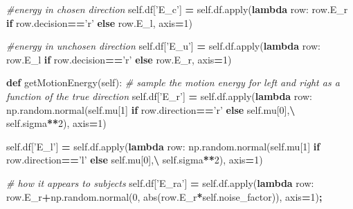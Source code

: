 \documentclass[12pt,twoside]{reedthesis}
\newenvironment{Shaded}{\begin{snugshade}}{\end{snugshade}}
\newcommand{\BuiltInTok}[1]{#1}
\newcommand{\CommentTok}[1]{\textcolor[rgb]{0.56,0.35,0.01}{\textit{#1}}}
\newcommand{\ControlFlowTok}[1]{\textcolor[rgb]{0.13,0.29,0.53}{\textbf{#1}}}
\newcommand{\DecValTok}[1]{\textcolor[rgb]{0.00,0.00,0.81}{#1}}
\newcommand{\KeywordTok}[1]{\textcolor[rgb]{0.13,0.29,0.53}{\textbf{#1}}}
\newcommand{\NormalTok}[1]{#1}
\newcommand{\OperatorTok}[1]{\textcolor[rgb]{0.81,0.36,0.00}{\textbf{#1}}}
\newcommand{\StringTok}[1]{\textcolor[rgb]{0.31,0.60,0.02}{#1}}
\newcommand{\VariableTok}[1]{\textcolor[rgb]{0.00,0.00,0.00}{#1}}
\begin{document}
\begin{Shaded}
\begin{Highlighting}[]
        \CommentTok{#energy in chosen direction}
        \VariableTok{self}\NormalTok{.df[}\StringTok{'E_c'}\NormalTok{] }\OperatorTok{=} \VariableTok{self}\NormalTok{.df.}\BuiltInTok{apply}\NormalTok{(}\KeywordTok{lambda}\NormalTok{ row: row.E_r }\ControlFlowTok{if}\NormalTok{ row.decision}\OperatorTok{==}\StringTok{'r'} \ControlFlowTok{else}\NormalTok{ row.E_l, axis}\OperatorTok{=}\DecValTok{1}\NormalTok{)}
        
        \CommentTok{#energy in unchosen direction}
        \VariableTok{self}\NormalTok{.df[}\StringTok{'E_u'}\NormalTok{] }\OperatorTok{=} \VariableTok{self}\NormalTok{.df.}\BuiltInTok{apply}\NormalTok{(}\KeywordTok{lambda}\NormalTok{ row: row.E_l }\ControlFlowTok{if}\NormalTok{ row.decision}\OperatorTok{==}\StringTok{'r'} \ControlFlowTok{else}\NormalTok{ row.E_r, axis}\OperatorTok{=}\DecValTok{1}\NormalTok{)}
        
    \KeywordTok{def}\NormalTok{ getMotionEnergy(}\VariableTok{self}\NormalTok{):}
    \CommentTok{# sample the motion energy for left and right as a function of the true direction}
        \VariableTok{self}\NormalTok{.df[}\StringTok{'E_r'}\NormalTok{] }\OperatorTok{=} \VariableTok{self}\NormalTok{.df.}\BuiltInTok{apply}\NormalTok{(}\KeywordTok{lambda}\NormalTok{ row: np.random.normal(}\VariableTok{self}\NormalTok{.mu[}\DecValTok{1}\NormalTok{] }\ControlFlowTok{if}\NormalTok{ row.direction}\OperatorTok{==}\StringTok{'r'} \ControlFlowTok{else} \VariableTok{self}\NormalTok{.mu[}\DecValTok{0}\NormalTok{],}\OperatorTok{\textbackslash{}}
                               \VariableTok{self}\NormalTok{.sigma}\OperatorTok{**}\DecValTok{2}\NormalTok{), axis}\OperatorTok{=}\DecValTok{1}\NormalTok{)}

        \VariableTok{self}\NormalTok{.df[}\StringTok{'E_l'}\NormalTok{] }\OperatorTok{=} \VariableTok{self}\NormalTok{.df.}\BuiltInTok{apply}\NormalTok{(}\KeywordTok{lambda}\NormalTok{ row: np.random.normal(}\VariableTok{self}\NormalTok{.mu[}\DecValTok{1}\NormalTok{] }\ControlFlowTok{if}\NormalTok{ row.direction}\OperatorTok{==}\StringTok{'l'} \ControlFlowTok{else} \VariableTok{self}\NormalTok{.mu[}\DecValTok{0}\NormalTok{],}\OperatorTok{\textbackslash{}}
                               \VariableTok{self}\NormalTok{.sigma}\OperatorTok{**}\DecValTok{2}\NormalTok{), axis}\OperatorTok{=}\DecValTok{1}\NormalTok{)}
        
    \CommentTok{# how it appears to subjects}
        \VariableTok{self}\NormalTok{.df[}\StringTok{'E_ra'}\NormalTok{] }\OperatorTok{=} \VariableTok{self}\NormalTok{.df.}\BuiltInTok{apply}\NormalTok{(}\KeywordTok{lambda}\NormalTok{ row: row.E_r}\OperatorTok{+}\NormalTok{np.random.normal(}\DecValTok{0}\NormalTok{, }\BuiltInTok{abs}\NormalTok{(row.E_r}\OperatorTok{*}\VariableTok{self}\NormalTok{.noise_factor)), axis}\OperatorTok{=}\DecValTok{1}\NormalTok{)}\OperatorTok{;}
        

\end{Highlighting}
\end{Shaded}
\end{document}
